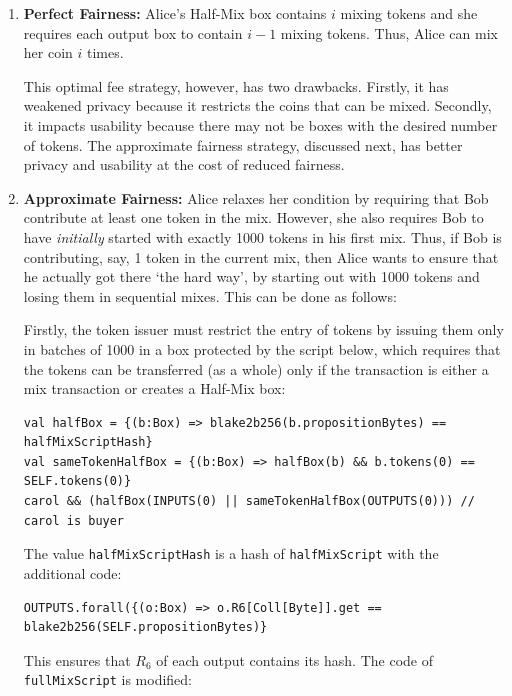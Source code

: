 \documentclass[11pt]{article}
\begin{document}
\begin{enumerate}
	\item \textbf{Perfect Fairness:} 
 Alice's Half-Mix box contains $i$ mixing tokens and she requires each output box to contain $i-1$ mixing tokens. Thus, Alice can mix her coin $i$ times. 
 
 This optimal fee strategy, however, has two drawbacks. Firstly, it has weakened privacy because it restricts the coins that can be mixed. Secondly, it impacts usability because there may not be boxes with the desired number of tokens. The approximate fairness strategy, discussed next, has better privacy and usability at the cost of reduced fairness.
 
 \item \textbf{Approximate Fairness:} Alice relaxes her condition by requiring that Bob contribute at least one token in the mix. %
 However, 
she also requires Bob to have {\em initially} started with exactly 1000 tokens in his first mix. Thus, if Bob is contributing, say, 1 token in the current mix, then Alice wants to ensure that he actually got there `the hard way', by starting out with 1000 tokens and losing them in sequential mixes. %
This can be done as follows:

Firstly, the token issuer must restrict the entry of tokens by issuing them only in batches of 1000 in a box protected by the script below,
which requires that the tokens can be transferred (as a whole) only if the transaction is either a mix transaction or creates a Half-Mix box: 
\begin{verbatim}
val halfBox = {(b:Box) => blake2b256(b.propositionBytes) == halfMixScriptHash}
val sameTokenHalfBox = {(b:Box) => halfBox(b) && b.tokens(0) == SELF.tokens(0)}
carol && (halfBox(INPUTS(0) || sameTokenHalfBox(OUTPUTS(0))) // carol is buyer
\end{verbatim}

The value \texttt{halfMixScriptHash} is a hash of \texttt{halfMixScript} with the additional code: 
\begin{verbatim}
OUTPUTS.forall({(o:Box) => o.R6[Coll[Byte]].get == blake2b256(SELF.propositionBytes)}
\end{verbatim}
This ensures that $R_6$ of each output 
contains its hash. The code of \texttt{fullMixScript} is modified:


\end{enumerate}
\end{document}
